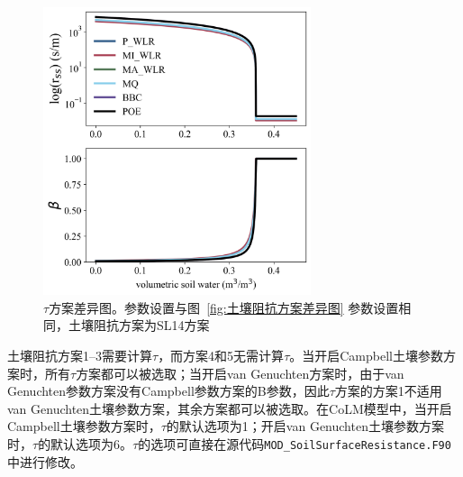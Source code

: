 {
  \begin{figure}[htb]
    \centering
    \includegraphics[width=0.7\textwidth]{Figures/地表湍流交换过程/tau方案差异图.png}
    \caption[\(\ \tau\)方案差异图]{$\tau$方案差异图。参数设置与图~\ref{fig:土壤阻抗方案差异图} 参数设置相同，土壤阻抗方案为SL14方案}
    \label{fig:tau方案差异图}
  \end{figure}
}

土壤阻抗方案1--3需要计算\(\tau\)，而方案4和5无需计算\(\tau\)。当开启Campbell土壤参数方案时，所有\(\tau\)方案都可以被选取；当开启van Genuchten方案时，由于van Genuchten参数方案没有Campbell参数方案的B参数，因此\(\tau\)方案的方案1不适用van Genuchten土壤参数方案，其余方案都可以被选取。在CoLM模型中，当开启Campbell土壤参数方案时，\(\tau\)的默认选项为1；开启van Genuchten土壤参数方案时，\(\tau\)的默认选项为6。\(\tau\)的选项可直接在源代码\texttt{MOD\_SoilSurfaceResistance.F90}中进行修改。

